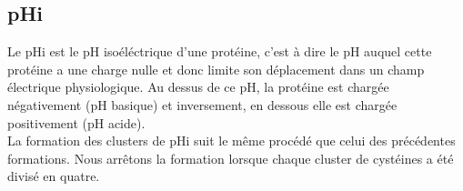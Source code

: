\subsection*{pHi}
Le pHi est le pH isoéléctrique d'une protéine, c'est à dire le pH auquel cette protéine a une charge nulle et donc limite son déplacement dans un champ électrique physiologique.
Au dessus de ce pH, la protéine est chargée négativement (pH basique) et inversement, en dessous elle est chargée positivement (pH acide).\\
La formation des clusters de pHi suit le m\^eme procédé que celui des précédentes formations. Nous arr\^etons la formation lorsque chaque cluster de cystéines a été divisé en quatre.

